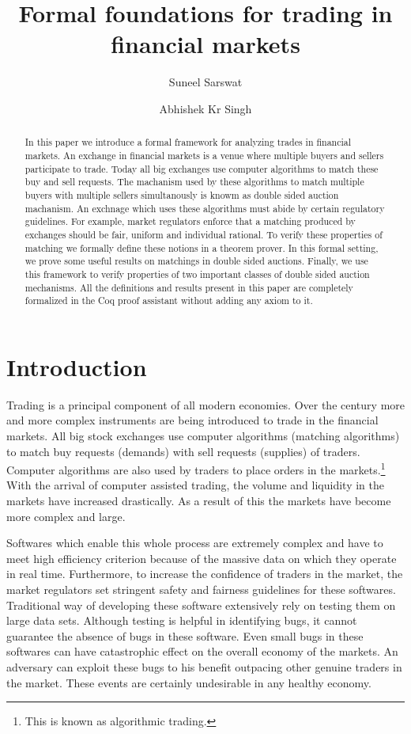 \documentclass[a4paper,UKenglish,cleveref, autoref]{lipics-v2019}
\title{Formal foundations for trading in financial markets} %
\author{Suneel Sarswat}{Tata Institute of Fundamental Research, India} {suneel.sarswat@gmail.com}
{}{}
\author{Abhishek Kr Singh}{Tata Institute of Fundamental Research, India} {abhishek.uor@gmail.com}
{}{}
\begin{document}
\newcommand{\tw}{\texttt}

\maketitle

\begin{abstract}


In this paper we introduce a formal framework for analyzing trades in financial markets. 
An exchange in financial markets is a venue where multiple buyers and sellers participate to trade.
Today all big exchanges use computer algorithms to match these buy and sell requests.
The machanism used by these algorithms to match multiple buyers with multiple sellers simultanously 
is knowm as double sided auction machanism.
An exchnage which uses these algorithms must abide by certain regulatory guidelines.
For example, market regulators enforce that a matching produced by exchanges should 
be fair, uniform and individual rational. 
To verify these properties of matching we formally define these notions
in a theorem prover. In this formal setting, we prove some useful results on matchings in double sided
auctions. Finally, we use this framework to verify properties of two important classes of double
sided auction mechanisms. All the definitions and results present in this paper are completely formalized in
the Coq proof assistant without adding any axiom to it. 
\end{abstract}

\section{Introduction}
\label{section1}

Trading is a principal component of all modern economies. Over the century more and more complex instruments are being introduced to trade in the financial markets. All big stock exchanges use computer algorithms (matching algorithms) to match buy requests (demands) with sell requests (supplies) of traders. Computer algorithms are also used by  traders to place orders in the markets.\footnote{This is known as algorithmic trading.} With the arrival of computer assisted trading, the volume and liquidity in the markets have increased drastically. As a result of this the markets have become more complex and large.  

Softwares which enable this whole process are extremely complex and have to meet high efficiency criterion because of the massive data on which they operate in real time. Furthermore, to increase the confidence of traders in the market, the market regulators set stringent safety and fairness guidelines for these softwares. Traditional way of developing these software extensively rely on testing them on large data sets. Although testing is helpful in identifying bugs, it cannot guarantee the absence of bugs in these software.  Even small bugs in these softwares can have catastrophic effect on the overall economy of the markets. An adversary can exploit these bugs to his benefit outpacing other genuine traders in the market.  These events are certainly undesirable in any healthy economy. 
\end{document}
